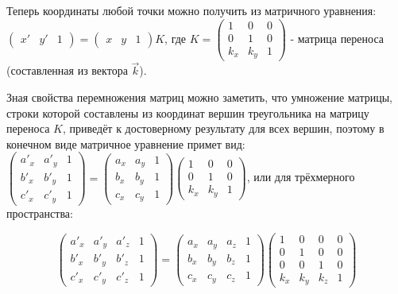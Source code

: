 \documentclass [12pt, a4paper] {article}
\begin{document}
Теперь координаты любой точки можно получить из матричного уравнения:
$\begin {pmatrix}
	x' & y' & 1
\end {pmatrix} = \begin {pmatrix}
	x & y & 1
\end {pmatrix} K$,
где $K = \begin {pmatrix}
	1 & 0 & 0\\
	0 & 1 & 0\\
	k_x & k_y & 1
\end {pmatrix}$ - матрица переноса (составленная из вектора $\overrightarrow{k}$).

Зная свойства перемножения матриц можно заметить, что умножение матрицы, строки которой составлены из координат вершин треугольника на матрицу переноса $K$, приведёт к достоверному результату для всех вершин, поэтому в конечном виде матричное уравнение примет вид:
$\begin {pmatrix}
	a'_x & a'_y & 1 \\
	b'_x & b'_y & 1 \\
	c'_x & c'_y & 1
\end {pmatrix} = \begin {pmatrix}
	a_x & a_y & 1 \\
	b_x & b_y & 1 \\
	c_x & c_y & 1
\end {pmatrix} \begin {pmatrix}
	1 & 0 & 0 \\
	0 & 1 & 0 \\
	k_x & k_y & 1
\end {pmatrix}$, или для трёхмерного пространства:

\begin {equation} \label {eq:translation}
	\begin {pmatrix}
		a'_x & a'_y & a'_z & 1 \\
		b'_x & b'_y & b'_z & 1 \\
		c'_x & c'_y & c'_z & 1
	\end {pmatrix} = \begin {pmatrix}
		a_x & a_y & a_z & 1 \\
		b_x & b_y & b_z & 1 \\
		c_x & c_y & c_z & 1
	\end {pmatrix} \begin {pmatrix}
		1 & 0 & 0 & 0 \\
		0 & 1 & 0 & 0 \\
		0 & 0 & 1 & 0 \\
		k_x & k_y & k_z & 1
	\end {pmatrix}
\end {equation}
\end{document}
